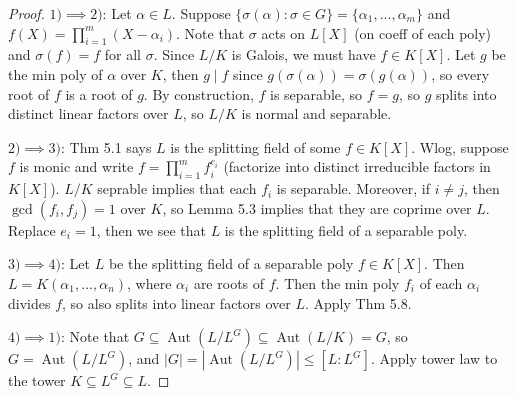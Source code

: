 \documentclass{article}
\theoremstyle{definition}
\theoremstyle{remark}
\theoremstyle{plain}
\newcommand{\Aut}{\operatorname{Aut}}
\begin{document}
\begin{proof}
    $1)\implies 2)$: Let $\alpha\in L$. Suppose $\{\sigma(\alpha):\sigma\in G\}=\{\alpha_1,...,\alpha_m\}$ and $f(X)=\prod_{i=1}^m(X-\alpha_i)$. Note that $\sigma$ acts on $L[X]$ (on coeff of each poly) and $\sigma(f)=f$ for all $\sigma$. Since $L/K$ is Galois, we must have $f\in K[X]$. Let $g$ be the min poly of $\alpha$ over $K$, then $g\mid f$ since $g(\sigma(\alpha))=\sigma(g(\alpha))$, so every root of $f$ is a root of $g$. By construction, $f$ is separable, so $f=g$, so $g$ splits into distinct linear factors over $L$, so $L/K$ is normal and separable.

    $2)\implies 3)$: Thm 5.1 says $L$ is the splitting field of some $f\in K[X]$. Wlog, suppose $f$ is monic and write $f=\prod_{i=1}^mf_i^{e_i}$ (factorize into distinct irreducible factors in $K[X]$). $L/K$ seprable implies that each $f_i$ is separable. Moreover, if $i\neq j$, then $\gcd(f_i,f_j)=1$ over $K$, so Lemma 5.3 implies that they are coprime over $L$. Replace $e_i=1$, then we see that $L$ is the splitting field of a separable poly.

    $3)\implies 4)$: Let $L$ be the splitting field of a separable poly $f\in K[X]$. Then $L=K(\alpha_1,...,\alpha_n)$, where $\alpha_i$ are roots of $f$. Then the min poly $f_i$ of each $\alpha_i$ divides $f$, so also splits into linear factors over $L$. Apply Thm 5.8.

    $4)\implies 1)$: Note that $G\subseteq\Aut(L/L^G)\subseteq\Aut(L/K)=G$, so $G=\Aut(L/L^G)$, and $|G|=|\Aut(L/L^G)|\le[L:L^G]$. Apply tower law to the tower $K\subseteq L^G\subseteq L$.
\end{proof}
\end{document}
